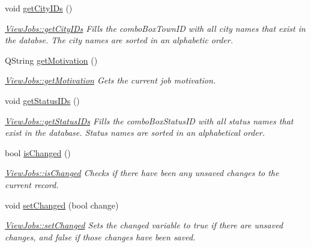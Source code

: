 \begin{DoxyCompactItemize}
\mbox{\label{class_view_jobs_a6cf031afcc4a09dfca54044fdf8c4f7b}} 
void \mbox{\hyperlink{class_view_jobs_a6cf031afcc4a09dfca54044fdf8c4f7b}{get\+City\+I\+Ds}} ()
\begin{DoxyCompactList}\small\item\em \mbox{\hyperlink{class_view_jobs_a6cf031afcc4a09dfca54044fdf8c4f7b}{View\+Jobs\+::get\+City\+I\+Ds}} Fills the combo\+Box\+Town\+ID with all city names that exist in the databse. The city names are sorted in an alphabetic order. \end{DoxyCompactList}\item 
Q\+String \mbox{\hyperlink{class_view_jobs_a238ec5365ef2c39baa97670769dfedca}{get\+Motivation}} ()
\begin{DoxyCompactList}\small\item\em \mbox{\hyperlink{class_view_jobs_a238ec5365ef2c39baa97670769dfedca}{View\+Jobs\+::get\+Motivation}} Gets the current job motivation. \end{DoxyCompactList}\item 
\mbox{\label{class_view_jobs_adabe196e81c74d17c436de1a6ea12099}} 
void \mbox{\hyperlink{class_view_jobs_adabe196e81c74d17c436de1a6ea12099}{get\+Status\+I\+Ds}} ()
\begin{DoxyCompactList}\small\item\em \mbox{\hyperlink{class_view_jobs_adabe196e81c74d17c436de1a6ea12099}{View\+Jobs\+::get\+Status\+I\+Ds}} Fills the combo\+Box\+Status\+ID with all status names that exist in the database. Status names are sorted in an alphabetical order. \end{DoxyCompactList}\item 
bool \mbox{\hyperlink{class_view_jobs_a5f75b45d28ce7f4a8050ce9ce0f44350}{is\+Changed}} ()
\begin{DoxyCompactList}\small\item\em \mbox{\hyperlink{class_view_jobs_a5f75b45d28ce7f4a8050ce9ce0f44350}{View\+Jobs\+::is\+Changed}} Checks if there have been any unsaved changes to the current record. \end{DoxyCompactList}\item 
void \mbox{\hyperlink{class_view_jobs_a3cba868c6deadaf4b35c18982f7ec35e}{set\+Changed}} (bool change)
\begin{DoxyCompactList}\small\item\em \mbox{\hyperlink{class_view_jobs_a3cba868c6deadaf4b35c18982f7ec35e}{View\+Jobs\+::set\+Changed}} Sets the changed variable to true if there are unsaved changes, and false if those changes have been saved. \end{DoxyCompactList}\item 

\end{DoxyCompactItemize}
